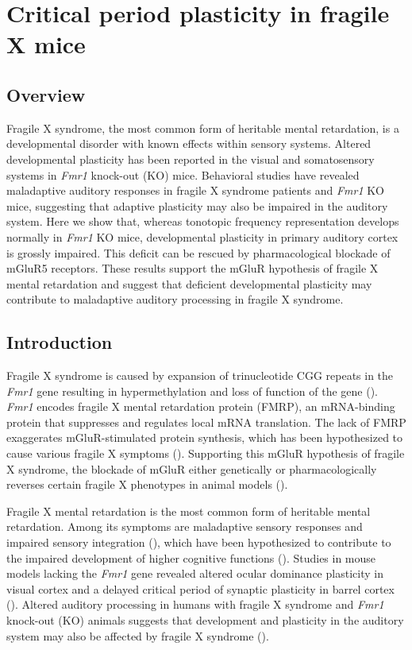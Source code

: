 \chapter{Critical period plasticity in fragile X mice}

\section{Overview}
\newrefsection

Fragile X syndrome, the most common form of heritable mental retardation, is a developmental disorder with known effects within sensory systems. Altered developmental plasticity has been reported in the visual and somatosensory systems in \textit{Fmr1} knock-out (KO) mice. Behavioral studies have revealed maladaptive auditory responses in fragile X syndrome patients and \textit{Fmr1} KO mice, suggesting that adaptive plasticity may also be impaired in the auditory system. Here we show that, whereas tonotopic frequency representation develops normally in \textit{Fmr1} KO mice, developmental plasticity in primary auditory cortex is grossly impaired. This deficit can be rescued by pharmacological blockade of mGluR5 receptors. These results support the mGluR hypothesis of fragile X mental retardation and suggest that deficient developmental plasticity may contribute to maladaptive auditory processing in fragile X syndrome.

\section{Introduction}

Fragile X syndrome is caused by expansion of trinucleotide CGG repeats in the \textit{Fmr1} gene resulting in hypermethylation and loss of function of the gene (\cite{Jin2003}). \textit{Fmr1} encodes fragile X mental retardation protein (FMRP), an mRNA-binding protein that suppresses and regulates local mRNA translation. The lack of FMRP exaggerates mGluR-stimulated protein synthesis, which has been hypothesized to cause various fragile X symptoms (\cite{Bear2004, Osterweil2010}). Supporting this mGluR hypothesis of fragile X syndrome, the blockade of mGluR either genetically or pharmacologically reverses certain fragile X phenotypes in animal models (\cite{McBride2005, Yan2005, Dolen2007, DeVrij2008, Meredith2011, Su2011, Michalon2012, Thomas2012}).

Fragile X mental retardation is the most common form of heritable mental retardation. Among its symptoms are maladaptive sensory responses and impaired sensory integration (\cite{Miller1999, Chen2001, Nielsen2002}), which have been hypothesized to contribute to the impaired development of higher cognitive functions (\cite{Hanson1986, Leblanc2011}). Studies in mouse models lacking the \textit{Fmr1} gene revealed altered ocular dominance plasticity in visual cortex and a delayed critical period of synaptic plasticity in barrel cortex (\cite{Dolen2007, Harlow2010}). Altered auditory processing in humans with fragile X syndrome and \textit{Fmr1} knock-out (KO) animals suggests that development and plasticity in the auditory system may also be affected by fragile X syndrome (\cite{Miller1999, Chen2001, Nielsen2002}).

